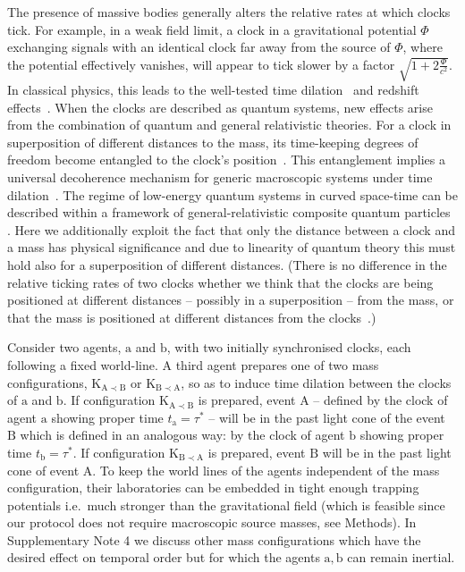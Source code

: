 \documentclass[a4paper,11pt]{article}
\begin{document}
The presence of massive bodies {generally} alters the {relative} rates at which clocks tick. For example, in a weak field limit, a clock in a gravitational potential $\Phi$ exchanging signals with an identical clock far away from the source of $\Phi$, where the potential effectively vanishes, will appear to tick slower by a factor $\sqrt{1+2 \frac{\Phi}{c^2}}$.
In classical physics, this  leads to the well-tested time dilation~\cite{HafeleKeating:1972b, Wineland:2010} and redshift effects~\cite{PoundRebka:1960}. When the clocks are described as quantum systems, new effects arise from the combination of quantum and general relativistic theories. For a clock in superposition of different distances to the mass, its {time-keeping degrees of freedom become}
entangled to the clock's position~\cite{Zych:2011, Zych:2012, Zych2016}. This entanglement implies a universal decoherence mechanism for generic  macroscopic systems under time dilation~\cite{pikovskiuniversal2015, pikovski2017time}. The regime of low-energy quantum systems in curved space-time can be described within a framework of general-relativistic composite quantum particles \cite{ZychPhDSpringer}. Here we additionally exploit the fact that only the distance between a clock and a mass has physical significance and due to linearity of quantum theory this must hold also for a superposition of different distances. (There is no difference in the relative ticking rates of two clocks whether we think that the clocks are being positioned at different distances -- possibly in a  superposition -- from the mass, or that the mass is positioned at different distances from the clocks~\cite{zych2018relativity}.)

Consider two agents, $\mathrm a$ and $\mathrm b$, with two initially synchronised clocks, each following a fixed world-line.
A third agent prepares one of two mass configurations, $\mathrm{K_{A\prec B}}$ or $\mathrm{K_{B\prec A}}$, so as to induce time dilation between the clocks of $\mathrm a$ and $\mathrm b$. If configuration $\mathrm{K_{A\prec B}}$ is prepared, event $\mathrm A$ -- defined by the clock of agent $\mathrm a$ showing proper time $t_\mathrm{a}=\tau^*$ -- will be in the past light cone of the event $\mathrm B$ which is defined in an analogous way: by the clock of  agent $\mathrm b$ showing proper time $t_\mathrm{b}=\tau^*$. If configuration $\mathrm{K_{B\prec A}}$ is prepared, event $\mathrm B$ will be in the past light cone of event $\mathrm A$. 
To keep the world lines of the agents independent of the mass configuration, their laboratories can be embedded in tight enough trapping potentials i.e.~much stronger than the gravitational field (which is feasible since our protocol does not require macroscopic source masses, see Methods).
In Supplementary Note 4  we discuss other mass configurations which have the desired effect on temporal order but for which the agents $\mathrm{a, b}$ can remain inertial.
\end{document}

